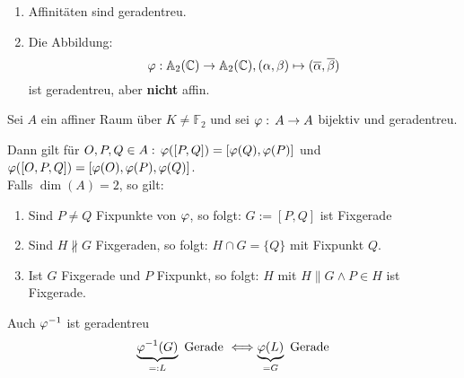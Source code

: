 \documentclass[parskip,a4paper,twoside,DIV15,BCOR12mm]{scrbook}
\begin{document}
\begin{example}
\begin{enumerate}
\item Affinitäten sind geradentreu.
\item Die Abbildung:
\[\varphi:\mathbb{A}_2(\mathbb{C})\to\mathbb{A}_2(\mathbb{C}), (\alpha,\beta)\mapsto
(\overline\alpha,\overline\beta)\]
ist geradentreu, aber \textbf{nicht} affin.
\end{enumerate}
\end{example}
\begin{lemma}
Sei \(A\) ein affiner Raum über \(K\neq\mathbb{F}_{2}\) und sei 
\(\varphi:\,A\to A\) bijektiv und geradentreu.

Dann gilt für \(O,P,Q\in A:\,\varphi([P,Q])=[\varphi(Q),\varphi(P)]\) und
\(\varphi([O,P,Q])=[\varphi(O),\varphi(P),\varphi(Q)]\).\\
Falls \(\dim(A)=2\), so gilt:
\begin{enumerate}
\item Sind \(P\neq Q\) Fixpunkte von \(\varphi\), so folgt: \(G:=[P,Q]\) ist 
 Fixgerade
\item Sind \(H\not\parallel G\) Fixgeraden, so folgt: \(H\cap G=\{Q\}\) mit
 Fixpunkt \(Q\).
\item Ist \(G\) Fixgerade und \(P\) Fixpunkt, so folgt: \(H\) mit 
\(H\parallel G\wedge P\in H\) ist Fixgerade.
\end{enumerate}
\end{lemma}
\begin{prerem}
Auch \(\varphi^{-1}\) ist geradentreu
\[
\underbrace{\varphi^{-1}(G)}_{=:L}\text{ Gerade }\Longleftrightarrow
    \underbrace{\varphi(L)}_{=G}\text{ Gerade}
\]
\end{prerem}
\end{document}
